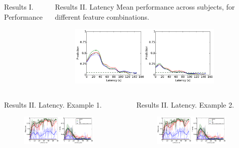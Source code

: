 \documentclass[final,t,overlay, xcolor=table, sans, mathserif]{beamer}
\begin{document}
\begin{frame}{}
\begin{columns}[t]
\begin{column}{.65\linewidth}
\begin{columns}
\begin{block}{Results I. Performance}
\begin{columns}
\begin{figure}
\end{figure}
\end{columns}
\end{block}
\begin{block}{Results II. Latency}
\centering
Mean performance across subjects, for different feature combinations.
\begin{figure}
\includegraphics[width=0.85\textwidth]{figures/all_latency.pdf}
\end{figure}
\end{block}
\end{columns}

\begin{columns}
\begin{block}{Results II. Latency. Example 1.}
\begin{figure}
\includegraphics[width=0.85\textwidth]{figures/Patient_2_latency.pdf}
\end{figure}
\end{block}
\begin{block}{Results II. Latency. Example 2.}
\begin{figure}
\includegraphics[width=0.85\textwidth]{figures/Patient_2_latency.pdf}
\end{figure}
\end{block}
\end{columns}





\end{column}
\end{columns}
\end{frame}
\end{document}
